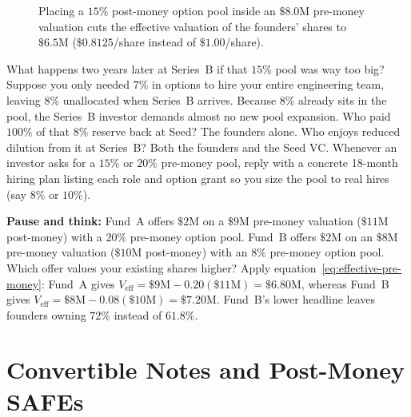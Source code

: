 \begin{figure}[htbp]
\caption{Placing a $15\%$ post-money option pool inside an $\$8.0\text{M}$ pre-money valuation cuts the effective valuation of the founders' shares to $\$6.5\text{M}$ ($\$0.8125$/share instead of $\$1.00$/share).}
\label{fig:option-pool-shuffle}
\end{figure}

\begin{happeningbox}
What happens two years later at Series~B if that $15\%$ pool was way too big? Suppose you only needed $7\%$ in options to hire your entire engineering team, leaving $8\%$ unallocated when Series~B arrives. Because $8\%$ already sits in the pool, the Series~B investor demands almost no new pool expansion. Who paid $100\%$ of that $8\%$ reserve back at Seed? The founders alone. Who enjoys reduced dilution from it at Series~B? Both the founders and the Seed VC. Whenever an investor asks for a $15\%$ or $20\%$ pre-money pool, reply with a concrete 18-month hiring plan listing each role and option grant so you size the pool to real hires (say $8\%$ or $10\%$).
\end{happeningbox}

\begin{recoverybox}
\textbf{Pause and think:} Fund~A offers $\$2\text{M}$ on a $\$9\text{M}$ pre-money valuation ($\$11\text{M}$ post-money) with a $20\%$ pre-money option pool. Fund~B offers $\$2\text{M}$ on an $\$8\text{M}$ pre-money valuation ($\$10\text{M}$ post-money) with an $8\%$ pre-money option pool. Which offer values your existing shares higher? Apply equation~\eqref{eq:effective-pre-money}: Fund~A gives $V_{\text{eff}} = \$9\text{M} - 0.20(\$11\text{M}) = \$6.80\text{M}$, whereas Fund~B gives $V_{\text{eff}} = \$8\text{M} - 0.08(\$10\text{M}) = \$7.20\text{M}$. Fund~B's lower headline leaves founders owning $72\%$ instead of $61.8\%$.
\end{recoverybox}

\section{Convertible Notes and Post-Money SAFEs}
\label{sec:convertible-notes-and-safes}


